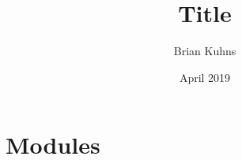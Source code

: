 \documentclass{article}
\title{Title}
\author{ Brian Kuhns }
\date{April 2019}
\begin{document}
\maketitle

\section{Modules}




\end{document}
